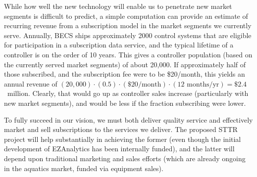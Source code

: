 While how well the new technology will enable us to penetrate new
market segments is difficult to predict, a simple computation can provide
an estimate of recurring revenue from a subscription model in the
market segments we currently serve.
Annually, BECS ships approximately 2000 control systems that are
eligible for participation in a subscription data service, and the
typical lifetime of a controller is on the order of 10 years.  This gives
a controller population (based on the currently served market segments) of
about 20,000.  If approximately half of those subscribed, and the subscription
fee were to be \$20/month, this yields an annual revenue of
$(20,000)\cdot(0.5)\cdot(\$20/\mbox{month})\cdot(12\mbox{ months/yr}) = \$2.4$~million.
Clearly, that would go up as controller sales increase (particularly with
new market segments), and would be less if the fraction subscribing
were lower.

To fully succeed in our vision, we must both deliver quality service
and effectively market and sell subscriptions to the services we
deliver.  The proposed STTR project will help substantially in achieving
the former (even though the initial development of EZAnalytics\texttrademark{}
has been internally funded), and the latter will depend upon traditional
marketing and sales efforts (which are already ongoing in the aquatics
market, funded via equipment sales).
